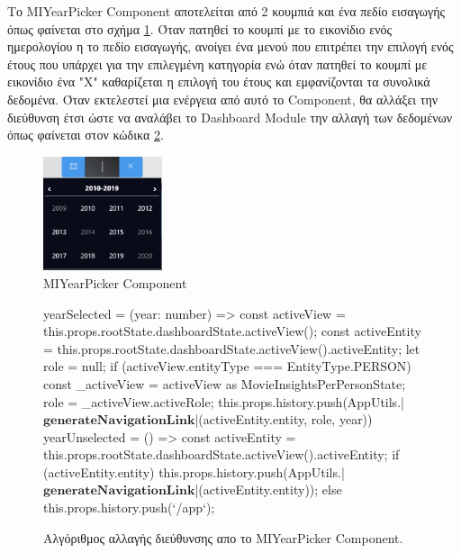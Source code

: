 Το MIYearPicker Component αποτελείται από 2 κουμπιά και ένα πεδίο εισαγωγής όπως φαίνεται στο σχήμα \ref{layout:miyearpicker}. Όταν πατηθεί το κουμπί με το εικονίδιο ενός ημερολογίου η το πεδίο εισαγωγής, ανοίγει ένα μενού που επιτρέπει την επιλογή ενός έτους που υπάρχει για την επιλεγμένη κατηγορία ενώ όταν πατηθεί το κουμπί με εικονίδιο ένα "Χ" καθαρίζεται η επιλογή του έτους και εμφανίζονται τα συνολικά δεδομένα. Όταν εκτελεστεί μια ενέργεια από αυτό το Component, θα αλλάξει την διεύθυνση έτσι ώστε να αναλάβει το Dashboard Module την αλλαγή των δεδομένων όπως φαίνεται στον κώδικα \ref{code:miyearpicker_urlchanger}.
\begin{figure}[h]
  \centering
  \includegraphics[width=35mm]{Chapters/5 - Architecture/Client/Images/miyearpicker.png}
  \caption{MIYearPicker Component}
  \label{layout:miyearpicker}
\end{figure}

\begin{figure}[h]
    \begin{TypeScriptcode}
yearSelected = (year: number) => {
  const activeView = this.props.rootState.dashboardState.activeView();
  const activeEntity = this.props.rootState.dashboardState.activeView().activeEntity;
  let role = null;
  if (activeView.entityType === EntityType.PERSON) {
    const _activeView = activeView as MovieInsightsPerPersonState;
    role = _activeView.activeRole;
  }
  this.props.history.push(AppUtils.|$\textbf{generateNavigationLink}$|(activeEntity.entity, role, year))
}
yearUnselected = () => {
  const activeEntity = this.props.rootState.dashboardState.activeView().activeEntity;
  if (activeEntity.entity) {
    this.props.history.push(AppUtils.|$\textbf{generateNavigationLink}$|(activeEntity.entity));
  } else {
    this.props.history.push(`/app`);
  }
}
    \end{TypeScriptcode}
    \caption{Αλγόριθμος αλλαγής διεύθυνσης απο το MIYearPicker Component.}
   \label{code:miyearpicker_urlchanger}
\end{figure}